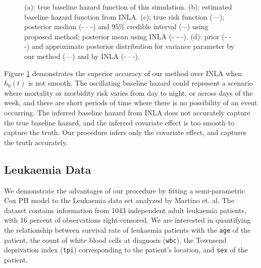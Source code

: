 \documentclass[AMA,STIX1COL,doublespace]{WileyNJD-v2}
\begin{document}
\begin{figure}[ht]
{}
\caption{(a): true baseline hazard function of this simulation. (b): estimated baseline hazard function from INLA. (c): true risk function (---); posterior median (- $\cdot$ -) and $95\%$ credible interval ($\cdots$) using proposed method; posterior mean using INLA (- - -). (d): prior (- - -) and approximate posterior distribution for variance parameter by our method (---) and by INLA (- $\cdot$ -).}
\label{fig:simulation}
\end{figure}

Figure \ref{fig:simulation} demonstrates the superior accuracy of our method over INLA when $h_{0}(t)$ is not smooth. The oscillating baseline hazard could represent a scenario where mortality or morbidity risk varies from day to night, or across days of the week, and there are short periods of time where there is no possibility of an event occurring. The inferred baseline hazard from INLA does not accurately capture the true baseline hazard, and the inferred covariate effect is too smooth to capture the truth. Our procedure infers only the covariate effect, and captures the truth accurately.


\subsection{Leukaemia Data}

We demonstrate the advantages of our procedure by fitting a semi-parametric Cox PH model to the Leukaemia data set analyzed by Martino et. al. \cite{inlacoxph} The dataset contains information from 1043 independent adult leukaemia patients, with 16 percent of observations right-censored. We are interested in quantifying the relationship between survival rate of leukaemia patients with the \texttt{age} of the patient, the count of white blood cells at diagnosis (\texttt{wbc}), the Townsend deprivation index (\texttt{tpi}) corresponding to the patient's location, and \texttt{sex} of the patient.
\end{document}
